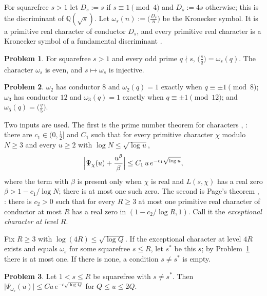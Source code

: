 \documentclass[reqno]{amsart}
\theoremstyle{definition}
\newtheorem{problem}{Problem}[section]
\theoremstyle{plain}
\newcommand{\Q}{\mathbb{Q}}
\begin{document}
For squarefree $s > 1$ let $D_s := s$ if $s \equiv 1 \pmod 4$ and $D_s := 4s$ otherwise; this is the discriminant of $\Q(\sqrt s)$.  Let $\omega_s(n) := \bigl(\frac{D_s}{n}\bigr)$ be the Kronecker symbol.  It is a primitive real character of conductor $D_s$, and every primitive real character is a Kronecker symbol of a fundamental discriminant \cite[Ch.~5]{Dav}.

\begin{problem}\label{pr:omega}
For squarefree $s > 1$ and every odd prime $q \nmid s$, $\bigl(\frac sq\bigr) = \omega_s(q)$.  The character $\omega_s$ is even, and $s \mapsto \omega_s$ is injective.
\end{problem}

\begin{problem}\label{pr:small-s}
$\omega_2$ has conductor $8$ and $\omega_2(q) = 1$ exactly when $q \equiv \pm 1 \pmod 8$; $\omega_3$ has conductor $12$ and $\omega_3(q) = 1$ exactly when $q \equiv \pm 1 \pmod{12}$; and $\omega_5(q) = \bigl(\frac q5\bigr)$.
\end{problem}

Two inputs are used.  The first is the prime number theorem for characters \cite[Ch.~20]{Dav}, \cite[Ch.~14]{Dav}: there are $c_1 \in (0, \frac12]$ and $C_1$ such that for every primitive character $\chi$ modulo $N \ge 3$ and every $u \ge 2$ with $\log N \le \sqrt{\log u}$,
\begin{equation}\label{eq:pnt}
  \Bigl\lvert \Psi_\chi(u) + \frac{u^\beta}{\beta} \Bigr\rvert \le C_1\, u\, e^{-c_1\sqrt{\log u}} ,
\end{equation}
where the term with $\beta$ is present only when $\chi$ is real and $L(s, \chi)$ has a real zero $\beta > 1 - c_1/\log N$; there is at most one such zero.  The second is Page's theorem \cite{Pa}, \cite[Ch.~14]{Dav}: there is $c_2 > 0$ such that for every $R \ge 3$ at most one primitive real character of conductor at most $R$ has a real zero in $(1 - c_2/\log R, 1)$.  Call it the \emph{exceptional character at level $R$}.

Fix $R \ge 3$ with $\log(4R) \le \sqrt{\log Q}$.  If the exceptional character at level $4R$ exists and equals $\omega_s$ for some squarefree $s \le R$, let $s^*$ be this $s$; by Problem~\ref{pr:omega} there is at most one.  If there is none, a condition $s \ne s^*$ is empty.

\begin{problem}\label{pr:psi-omega}
Let $1 < s \le R$ be squarefree with $s \ne s^*$.  Then $\lvert \Psi_{\omega_s}(u) \rvert \le C u\, e^{-c\sqrt{\log Q}}$ for $Q \le u \le 2Q$.
\end{problem}
\end{document}
